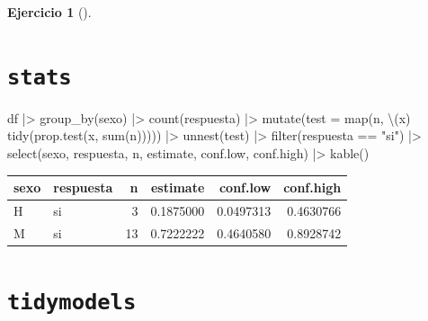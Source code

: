 \documentclass[
  a4paper,
]{scrreport}
\newenvironment{Shaded}{\begin{snugshade}}{\end{snugshade}}
\newcommand{\AttributeTok}[1]{\textcolor[rgb]{0.40,0.45,0.13}{#1}}
\newcommand{\FunctionTok}[1]{\textcolor[rgb]{0.28,0.35,0.67}{#1}}
\newcommand{\NormalTok}[1]{\textcolor[rgb]{0.00,0.23,0.31}{#1}}
\newcommand{\SpecialCharTok}[1]{\textcolor[rgb]{0.37,0.37,0.37}{#1}}
\newcommand{\StringTok}[1]{\textcolor[rgb]{0.13,0.47,0.30}{#1}}
\theoremstyle{definition}
\newtheorem{exercise}{Ejercicio}[chapter]
\theoremstyle{remark}
\begin{document}
\begin{exercise}[]
\begin{enumerate}
  \begin{tcolorbox}[enhanced jigsaw, coltitle=black, left=2mm, colback=white, leftrule=.75mm, toptitle=1mm, breakable, bottomrule=.15mm, titlerule=0mm, bottomtitle=1mm, title=\textcolor{quarto-callout-tip-color}{\faLightbulb}\hspace{0.5em}{Solución}, arc=.35mm, toprule=.15mm, rightrule=.15mm, colframe=quarto-callout-tip-color-frame, opacityback=0, colbacktitle=quarto-callout-tip-color!10!white, opacitybacktitle=0.6]

  \section{\texorpdfstring{\texttt{stats}}{stats}}

\begin{Shaded}
\begin{Highlighting}[]
\NormalTok{df }\SpecialCharTok{|\textgreater{}} 
    \FunctionTok{group\_by}\NormalTok{(sexo) }\SpecialCharTok{|\textgreater{}} 
    \FunctionTok{count}\NormalTok{(respuesta) }\SpecialCharTok{|\textgreater{}} 
    \FunctionTok{mutate}\NormalTok{(}\AttributeTok{test =} \FunctionTok{map}\NormalTok{(n, \textbackslash{}(x) }\FunctionTok{tidy}\NormalTok{(}\FunctionTok{prop.test}\NormalTok{(x, }\FunctionTok{sum}\NormalTok{(n))))) }\SpecialCharTok{|\textgreater{}}     
    \FunctionTok{unnest}\NormalTok{(test) }\SpecialCharTok{|\textgreater{}}
    \FunctionTok{filter}\NormalTok{(respuesta }\SpecialCharTok{==} \StringTok{"si"}\NormalTok{) }\SpecialCharTok{|\textgreater{}} 
    \FunctionTok{select}\NormalTok{(sexo, respuesta, n, estimate, conf.low, conf.high) }\SpecialCharTok{|\textgreater{}}  
    \FunctionTok{kable}\NormalTok{() }
\end{Highlighting}
\end{Shaded}

  \begin{longtable}[]{@{}llrrrr@{}}
  \toprule\noalign{}
  sexo & respuesta & n & estimate & conf.low & conf.high \\
  \midrule\noalign{}
  \endhead
  \bottomrule\noalign{}
  \endlastfoot
  H & si & 3 & 0.1875000 & 0.0497313 & 0.4630766 \\
  M & si & 13 & 0.7222222 & 0.4640580 & 0.8928742 \\
  \end{longtable}

  \section{\texorpdfstring{\texttt{tidymodels}}{tidymodels}}


\end{tcolorbox}
\end{enumerate}
\end{exercise}
\end{document}
